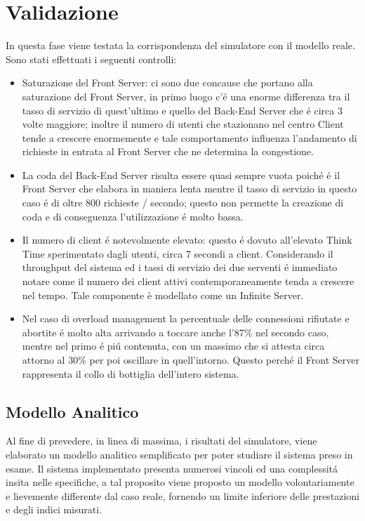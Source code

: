 \chapter{Validazione} 

In questa fase viene testata la corrispondenza del simulatore con il modello reale. Sono stati effettuati i seguenti controlli:

\begin{itemize}
 \item Saturazione del Front Server: ci sono due concause che portano alla saturazione del Front Server, in primo luogo c'\'e una enorme differenza tra il tasso di servizio di quest'ultimo e quello del Back-End Server che \'e circa 3 volte maggiore; inoltre il numero di utenti che stazionano nel centro Client tende a crescere enormemente e tale comportamento influenza l'andamento di richieste in entrata al Front Server che ne determina la congestione.
 
 \item La coda del Back-End Server risulta essere quasi sempre vuota poich\'e \'e il Front Server che elabora in maniera lenta mentre il tasso di servizio in questo caso \'e di oltre 800 richieste / secondo; questo non permette la creazione di coda e di conseguenza l'utilizzazione \'e molto bassa.
 
 \item Il numero di client \'e notevolmente elevato: questo \'e dovuto all'elevato Think Time sperimentato dagli utenti, circa 7 secondi a client. Considerando il throughput del sistema ed i tassi di servizio dei due serventi \'e immediato notare come il numero dei client attivi contemporaneamente tenda a crescere nel tempo. Tale componente è modellato come un Infinite Server.
 
 \item Nel caso di overload management la percentuale delle connessioni rifiutate e abortite \'e molto alta arrivando a toccare anche l'87\% nel secondo caso, mentre nel primo \'e pi\'u contenuta, con un massimo che si attesta circa attorno al 30\% per poi oscillare in quell'intorno. Questo perch\'e il Front Server rappresenta il collo di bottiglia dell'intero sistema.
\end{itemize}

\section{Modello Analitico}
Al fine di prevedere, in linea di massima, i risultati del simulatore, viene 
elaborato un modello  analitico semplificato per poter studiare il sistema preso 
in esame.
Il sistema implementato presenta numerosi vincoli ed una complessit\'a insita 
nelle specifiche, a tal proposito viene proposto un modello volontariamente e 
lievemente differente dal caso reale, fornendo un limite inferiore delle 
prestazioni e degli indici misurati.

